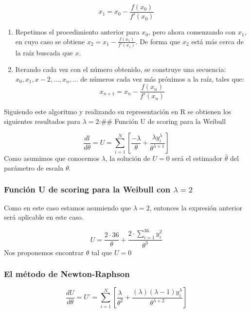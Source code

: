 \documentclass[
]{article}
\begin{document}
\[x_{1}=x_{0}−\frac{f(x_{0})}{f′(x_{0})}\]

\begin{enumerate}
\def\labelenumi{\arabic{enumi}.}
\setcounter{enumi}{5}
\item
  Repetimos el procedimiento anterior para \(x_{0}\), pero ahora
  comenzando con \(x_{1}\), en cuyo caso se obtiene
  \(x_{2}=x_{1}−\frac{f(x_{1})}{f′(x_{1})}\). De forma que \(x_{2}\)
  está más cerca de la raíz buscada que \(x\).
\item
  Iterando cada vez con el número obtenido, se construye una secuencia:
  \(x_{0},x_{1},x−2,…,x_{n},…\) de números cada vez más próximos a la
  raíz, tales que: \[x_{n+1}=x_{n}−\frac{f(x_{n})}{f′(x_{n})}\]
\end{enumerate}

Siguiendo este algoritmo y realizando su representación en R se obtienen
los siguientes resultados para \(\lambda=2\):\#\# Función U de scoring
para la Weibull

\[ \frac{dl}{d\theta}=U=\displaystyle\sum_{i=1}^{N}\left[ \frac{-\lambda}{\theta}+\frac{\lambda y^{\lambda}_{i}}{\theta^{\lambda+1}}\right]\]
Como asumimos que conocemos \(\lambda\), la solución de \(U=0\) será el
estimador \(\hat{\theta}\) del parámetro de escala \(\theta\).

\hypertarget{funciuxf3n-u-de-scoring-para-la-weibull-con-lambda2}{%
\subsubsection{\texorpdfstring{Función U de scoring para la Weibull con
\(\lambda=2\)}{Función U de scoring para la Weibull con \textbackslash lambda=2}}\label{funciuxf3n-u-de-scoring-para-la-weibull-con-lambda2}}

Como en este caso estamos asumiendo que \(\lambda=2\), entonces la
expresión anterior será aplicable en este caso.

\[U=\frac{2\cdot 36}{\theta}+\frac{2\cdot \displaystyle\sum_{i=1}^{36}y^{2}_{i}}{\theta^{3}}\]
Nos proponemos encontrar \(\theta\) tal que \(U=0\)

\hypertarget{el-muxe9todo-de-newton-raphson}{%
\subsubsection{El método de
Newton-Raphson}\label{el-muxe9todo-de-newton-raphson}}

\[ \frac{dU}{d\theta}=U’=\displaystyle\sum_{i=1}^{N}\left[ \frac{\lambda}{\theta^{2}}+\frac{(\lambda) (\lambda-1) y^{\lambda}_{i}}{\theta^{\lambda+2}}\right]\]
\end{document}
